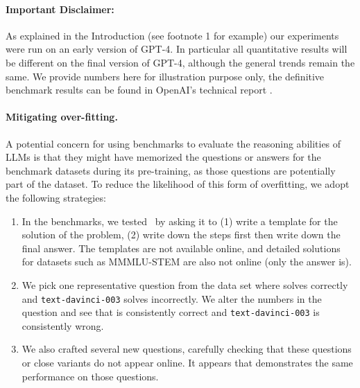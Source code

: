 \paragraph{Important Disclaimer:} As explained in the Introduction (see footnote 1 for example) our experiments were run on an early version of GPT-4. In particular all quantitative results will be different on the final version of GPT-4, although the general trends remain the same. We provide numbers here for illustration purpose only, the definitive benchmark results can be found in OpenAI's technical report \cite{gpt4}.

\paragraph{Mitigating over-fitting.} A potential concern for using benchmarks to evaluate the reasoning abilities of LLMs is that they might have memorized the questions or answers for the benchmark datasets during its pre-training, as those questions are potentially part of the dataset. To reduce the likelihood of this form of overfitting, we adopt the following strategies:
\begin{enumerate}
    \item In the benchmarks, we tested \DV \ by asking it to (1) write a template for the solution of the problem, (2) write down the steps first then write down the final answer. The templates are not available online, and detailed solutions for datasets such as MMMLU-STEM are also not online (only the answer is). %
    \item We pick one representative question from the data set where {\DV} solves correctly and \texttt{text-davinci-003} solves incorrectly. We alter the numbers in the question and see that {\DV} is consistently correct and \texttt{text-davinci-003} is consistently wrong. 
    \item We also crafted several new questions, carefully checking that these questions or close variants do not appear online. It appears that {\DV} demonstrates the same performance on those questions. 
\end{enumerate}
